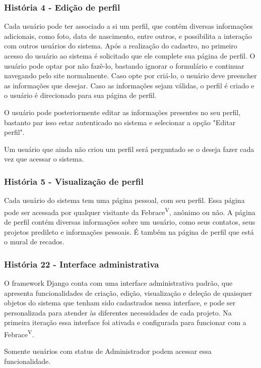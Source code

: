 \documentclass[a4paper,12pt,font=plain,header=plain]{abnt}
\begin{document}
    \subsubsection{História 4 - Edição de perfil}
      Cada usuário pode ter associado a si um perfil, que contém diversas informações adicionais, como foto, data de nascimento, entre outros, e possibilita a interação com outros usuários do sistema. Após a realização do cadastro, no primeiro acesso do usuário ao sistema é solicitado que ele complete sua página de perfil. O usuário pode optar por não fazê-lo, bastando ignorar o formulário e continuar navegando pelo site normalmente. Caso opte por criá-lo, o usuário deve preencher as informações que desejar. Caso as informações sejam válidas, o perfil é criado e o usuário é direcionado para sua página de perfil.

      O usuário pode posteriormente editar as informações presentes no seu perfil, bastanto par isso estar autenticado no sistema e selecionar a opção "Editar perfil".

      Um usuário que ainda não criou um perfil será perguntado se o deseja fazer cada vez que acessar o sistema.

    \subsubsection{História 5 - Visualização de perfil}
      Cada usuário do sistema tem uma página pessoal, com seu perfil. Essa página pode ser acessada por qualquer visitante da Febrace\textsuperscript{V}, anônimo ou não. A página de perfil contém diversas informações sobre um usuário, como seus contatos, seus projetos predileto e informações pessoais. É também na página de perfil que está o mural de recados.

    \subsubsection{História 22 - Interface administrativa}
      O framework Django conta com uma interface administrativa padrão, que apresenta funcionalidades de criação, edição, visualização e deleção de quaisquer objetos do sistema que tenham sido cadastrados nessa interface, e pode ser personalizada para atender às diferentes necessidades de cada projeto. Na primeira iteração essa interface foi ativada e configurada para funcionar com a Febrace\textsuperscript{V}.

      Somente usuários com status de Administrador podem acessar essa funcionalidade.
\end{document}
